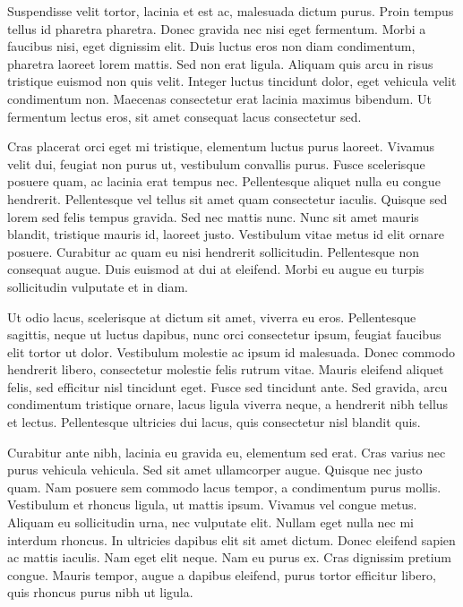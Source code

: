 Suspendisse velit tortor, lacinia et est ac, malesuada dictum purus. Proin tempus tellus id pharetra pharetra. Donec gravida nec nisi eget fermentum. Morbi a faucibus nisi, eget dignissim elit. Duis luctus eros non diam condimentum, pharetra laoreet lorem mattis. Sed non erat ligula. Aliquam quis arcu in risus tristique euismod non quis velit. Integer luctus tincidunt dolor, eget vehicula velit condimentum non. Maecenas consectetur erat lacinia maximus bibendum. Ut fermentum lectus eros, sit amet consequat lacus consectetur sed.

Cras placerat orci eget mi tristique, elementum luctus purus laoreet. Vivamus velit dui, feugiat non purus ut, vestibulum convallis purus. Fusce scelerisque posuere quam, ac lacinia erat tempus nec. Pellentesque aliquet nulla eu congue hendrerit. Pellentesque vel tellus sit amet quam consectetur iaculis. Quisque sed lorem sed felis tempus gravida. Sed nec mattis nunc. Nunc sit amet mauris blandit, tristique mauris id, laoreet justo. Vestibulum vitae metus id elit ornare posuere. Curabitur ac quam eu nisi hendrerit sollicitudin. Pellentesque non consequat augue. Duis euismod at dui at eleifend. Morbi eu augue eu turpis sollicitudin vulputate et in diam.

Ut odio lacus, scelerisque at dictum sit amet, viverra eu eros. Pellentesque sagittis, neque ut luctus dapibus, nunc orci consectetur ipsum, feugiat faucibus elit tortor ut dolor. Vestibulum molestie ac ipsum id malesuada. Donec commodo hendrerit libero, consectetur molestie felis rutrum vitae. Mauris eleifend aliquet felis, sed efficitur nisl tincidunt eget. Fusce sed tincidunt ante. Sed gravida, arcu condimentum tristique ornare, lacus ligula viverra neque, a hendrerit nibh tellus et lectus. Pellentesque ultricies dui lacus, quis consectetur nisl blandit quis.

Curabitur ante nibh, lacinia eu gravida eu, elementum sed erat. Cras varius nec purus vehicula vehicula. Sed sit amet ullamcorper augue. Quisque nec justo quam. Nam posuere sem commodo lacus tempor, a condimentum purus mollis. Vestibulum et rhoncus ligula, ut mattis ipsum. Vivamus vel congue metus. Aliquam eu sollicitudin urna, nec vulputate elit. Nullam eget nulla nec mi interdum rhoncus. In ultricies dapibus elit sit amet dictum. Donec eleifend sapien ac mattis iaculis. Nam eget elit neque. Nam eu purus ex. Cras dignissim pretium congue. Mauris tempor, augue a dapibus eleifend, purus tortor efficitur libero, quis rhoncus purus nibh ut ligula.


